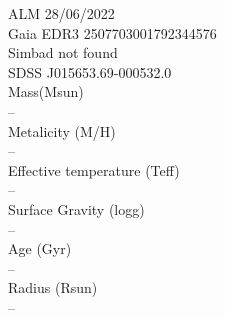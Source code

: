 ALM 28/06/2022\\
Gaia EDR3 2507703001792344576\\
Simbad not found\\
SDSS J015653.69-000532.0\\
Mass(Msun)\\
--\\
Metalicity (M/H)\\
--\\
Effective temperature (Teff) \\
--\\
Surface Gravity (logg) \\
--\\
Age (Gyr)\\
--\\
Radius (Rsun)\\
--\\

